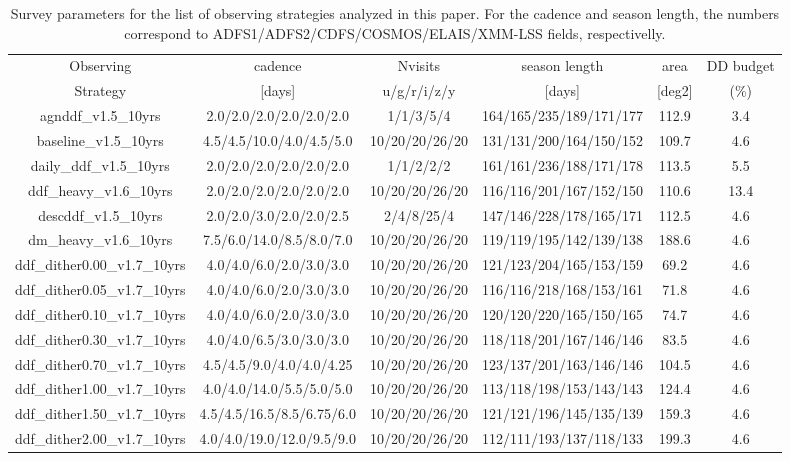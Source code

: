 \begin{table}[!htbp] 
\caption{Survey parameters for the list of observing strategies analyzed in this paper. For the cadence and season length, the numbers correspond to ADFS1/ADFS2/CDFS/COSMOS/ELAIS/XMM-LSS fields, respectivelly.}\label{tab:os} 
\begin{adjustbox}{width=1.2\linewidth,center} 
\begin{tabular}{c|c|c|c|c|c} 
 Observing & cadence & Nvisits & season length & area & DD budget\\ 
 Strategy & [days] & u/g/r/i/z/y & [days] & [deg2] &(\%)\\ 
\hline 
agnddf\_v1.5\_10yrs & 2.0/2.0/2.0/2.0/2.0/2.0 & 1/1/3/5/4 & 164/165/235/189/171/177 & 112.9 & 3.4 \\ 
\hline 
baseline\_v1.5\_10yrs & 4.5/4.5/10.0/4.0/4.5/5.0 & 10/20/20/26/20 & 131/131/200/164/150/152 & 109.7 & 4.6 \\ 
\hline 
daily\_ddf\_v1.5\_10yrs & 2.0/2.0/2.0/2.0/2.0/2.0 & 1/1/2/2/2 & 161/161/236/188/171/178 & 113.5 & 5.5 \\ 
\hline 
ddf\_heavy\_v1.6\_10yrs & 2.0/2.0/2.0/2.0/2.0/2.0 & 10/20/20/26/20 & 116/116/201/167/152/150 & 110.6 & 13.4 \\ 
\hline 
descddf\_v1.5\_10yrs & 2.0/2.0/3.0/2.0/2.0/2.5 & 2/4/8/25/4 & 147/146/228/178/165/171 & 112.5 & 4.6 \\ 
\hline 
dm\_heavy\_v1.6\_10yrs & 7.5/6.0/14.0/8.5/8.0/7.0 & 10/20/20/26/20 & 119/119/195/142/139/138 & 188.6 & 4.6 \\ 
\hline 
ddf\_dither0.00\_v1.7\_10yrs & 4.0/4.0/6.0/2.0/3.0/3.0 & 10/20/20/26/20 & 121/123/204/165/153/159 & 69.2 & 4.6 \\ 
\hline 
ddf\_dither0.05\_v1.7\_10yrs & 4.0/4.0/6.0/2.0/3.0/3.0 & 10/20/20/26/20 & 116/116/218/168/153/161 & 71.8 & 4.6 \\ 
\hline 
ddf\_dither0.10\_v1.7\_10yrs & 4.0/4.0/6.0/2.0/3.0/3.0 & 10/20/20/26/20 & 120/120/220/165/150/165 & 74.7 & 4.6 \\ 
\hline 
ddf\_dither0.30\_v1.7\_10yrs & 4.0/4.0/6.5/3.0/3.0/3.0 & 10/20/20/26/20 & 118/118/201/167/146/146 & 83.5 & 4.6 \\ 
\hline 
ddf\_dither0.70\_v1.7\_10yrs & 4.5/4.5/9.0/4.0/4.0/4.25 & 10/20/20/26/20 & 123/137/201/163/146/146 & 104.5 & 4.6 \\ 
\hline 
ddf\_dither1.00\_v1.7\_10yrs & 4.0/4.0/14.0/5.5/5.0/5.0 & 10/20/20/26/20 & 113/118/198/153/143/143 & 124.4 & 4.6 \\ 
\hline 
ddf\_dither1.50\_v1.7\_10yrs & 4.5/4.5/16.5/8.5/6.75/6.0 & 10/20/20/26/20 & 121/121/196/145/135/139 & 159.3 & 4.6 \\ 
\hline 
ddf\_dither2.00\_v1.7\_10yrs & 4.0/4.0/19.0/12.0/9.5/9.0 & 10/20/20/26/20 & 112/111/193/137/118/133 & 199.3 & 4.6 \\ 
\end{tabular} 
\end{adjustbox} 
\end{table} 
